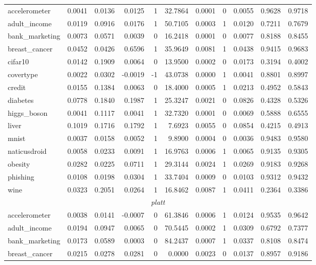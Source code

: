 \documentclass{article}
\theoremstyle{plain}
\theoremstyle{definition}
\theoremstyle{remark}
\begin{document}
\begin{table}[ht]
\begin{tabular}{lrrrrrrrrrr}
\midrule
accelerometer & 0.0041 & 0.0136 & 0.0125 & 1 & 32.7864 & 0.0001 & 0 & 0.0055 & 0.9628 & 0.9718 \\
adult\_income & 0.0119 & 0.0916 & 0.0176 & 1 & 50.7105 & 0.0003 & 1 & 0.0120 & 0.7211 & 0.7679 \\
bank\_marketing & 0.0073 & 0.0571 & 0.0039 & 0 & 16.2418 & 0.0001 & 0 & 0.0077 & 0.8188 & 0.8455 \\
breast\_cancer & 0.0452 & 0.0426 & 0.6596 & 1 & 35.9649 & 0.0081 & 1 & 0.0438 & 0.9415 & 0.9683 \\
cifar10 & 0.0142 & 0.1909 & 0.0064 & 0 & 13.9500 & 0.0002 & 0 & 0.0173 & 0.3194 & 0.4002 \\
covertype & 0.0022 & 0.0302 & -0.0019 & -1 & 43.0738 & 0.0000 & 1 & 0.0041 & 0.8801 & 0.8997 \\
credit & 0.0155 & 0.1384 & 0.0063 & 0 & 18.4000 & 0.0005 & 1 & 0.0213 & 0.4952 & 0.5843 \\
diabetes & 0.0778 & 0.1840 & 0.1987 & 1 & 25.3247 & 0.0021 & 0 & 0.0826 & 0.4328 & 0.5326 \\
higgs\_boson & 0.0041 & 0.1117 & 0.0041 & 1 & 32.7320 & 0.0001 & 0 & 0.0069 & 0.5888 & 0.6555 \\
liver & 0.1019 & 0.1716 & 0.1792 & 1 & 7.6923 & 0.0055 & 0 & 0.0854 & 0.4215 & 0.4913 \\
mnist & 0.0037 & 0.0158 & 0.0052 & 1 & 9.8900 & 0.0004 & 0 & 0.0036 & 0.9483 & 0.9580 \\
naticusdroid & 0.0058 & 0.0233 & 0.0091 & 1 & 16.9763 & 0.0006 & 1 & 0.0065 & 0.9135 & 0.9305 \\
obesity & 0.0282 & 0.0225 & 0.0711 & 1 & 29.3144 & 0.0024 & 1 & 0.0269 & 0.9183 & 0.9268 \\
phishing & 0.0108 & 0.0198 & 0.0304 & 1 & 33.7404 & 0.0009 & 0 & 0.0103 & 0.9312 & 0.9432 \\
wine & 0.0323 & 0.2051 & 0.0264 & 1 & 16.8462 & 0.0087 & 1 & 0.0411 & 0.2364 & 0.3386 \\
\midrule
\multicolumn{11}{c}{\textit{platt}} \\
\midrule
accelerometer & 0.0038 & 0.0141 & -0.0007 & 0 & 61.3846 & 0.0006 & 1 & 0.0124 & 0.9535 & 0.9642 \\
adult\_income & 0.0194 & 0.0947 & 0.0065 & 0 & 70.5445 & 0.0002 & 1 & 0.0309 & 0.6792 & 0.7377 \\
bank\_marketing & 0.0173 & 0.0589 & 0.0003 & 0 & 84.2437 & 0.0007 & 1 & 0.0337 & 0.8108 & 0.8474 \\
breast\_cancer & 0.0215 & 0.0278 & 0.0281 & 0 & 0.0000 & 0.0023 & 0 & 0.0137 & 0.8957 & 0.9186 \\

\end{tabular}
\end{table}
\end{document}
